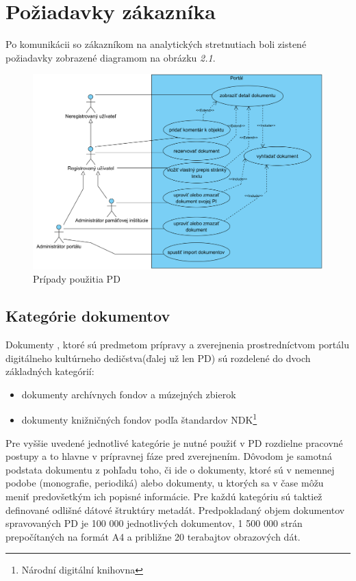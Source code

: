 \documentclass[
  print, %
  table,   %
  lof,     %
  nolot,     %
]{fithesis3}
\begin{document}
\section{Požiadavky zákazníka}
Po komunikácii so zákazníkom na analytických stretnutiach boli zistené požiadavky zobrazené diagramom na obrázku \textit{2.1}.\cite{uml1}\cite{uml2}
\begin{figure}[H]
	\centering
		\includegraphics[width=\textwidth]{fithesis/diagram/useCase.png}
	
	\caption{Prípady použitia PD}
	\label{useCaseDG}
\end{figure}

\subsection{Kategórie dokumentov}
Dokumenty , ktoré sú predmetom prípravy a zverejnenia prostredníctvom portálu digitálneho kultúrneho dedičstva(ďalej už len PD) sú rozdelené do dvoch základných kategórií:
\begin{itemize}
	\item dokumenty archívnych fondov a múzejných zbierok				
	\item dokumenty knižničných fondov podľa štandardov NDK\footnote{Národní digitální knihovna}
\end{itemize}
Pre vyššie uvedené jednotlivé kategórie je nutné použiť v PD rozdielne pracovné postupy a to hlavne v prípravnej fáze pred zverejnením. Dôvodom je samotná podstata dokumentu z pohľadu toho, či ide o dokumenty, ktoré sú v nemennej podobe (monografie, periodiká) alebo dokumenty, u ktorých sa v čase môžu meniť predovšetkým ich popisné informácie. Pre každú kategóriu sú taktiež definované odlišné dátové štruktúry metadát. Predpokladaný objem dokumentov spravovaných PD je 100 000 jednotlivých dokumentov, 1 500 000 strán prepočítaných na formát A4 a približne 20 terabajtov obrazových dát.
\end{document}
